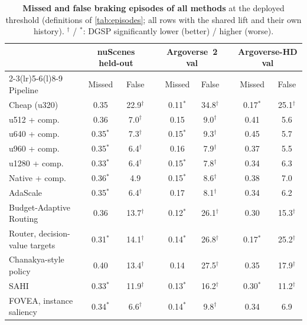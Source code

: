 \documentclass[10pt,letterpaper]{article}
\newcommand{\method}{DGSP\xspace}
\theoremstyle{remark}
\theoremstyle{plain}
\theoremstyle{definition}
\begin{document}
\begin{table}[!htbp]
\centering
\caption{\textbf{Missed and false braking episodes of all methods} at the deployed threshold (definitions of \cref{tab:episodes}; all rows with the shared lift and their own history). $^{\dagger}$ / $^{\ast}$: \method significantly lower (better) / higher (worse).}
\label{tab:episodes_all}
\footnotesize
\setlength{\tabcolsep}{4pt}
\begin{tabular}{@{}lcccccccc@{}}
\toprule
 & \multicolumn{2}{c}{nuScenes held-out} & & \multicolumn{2}{c}{Argoverse~2 val} & & \multicolumn{2}{c}{Argoverse-HD val} \\
\cmidrule(lr){2-3}\cmidrule(lr){5-6}\cmidrule(l){8-9}
Pipeline & Missed & False & & Missed & False & & Missed & False \\
\midrule
Cheap (u320) & 0.35 & 22.9$^{\dagger}$ &  & 0.11$^{\ast}$ & 34.8$^{\dagger}$ &  & 0.17$^{\ast}$ & 25.1$^{\dagger}$ \\
u512 + comp. & 0.36 & 7.0$^{\dagger}$ &  & 0.15 & 9.0$^{\dagger}$ &  & 0.41 & 5.6 \\
u640 + comp. & 0.35$^{\ast}$ & 7.3$^{\dagger}$ &  & 0.15$^{\ast}$ & 9.3$^{\dagger}$ &  & 0.45 & 5.7 \\
u960 + comp. & 0.35$^{\ast}$ & 6.4$^{\dagger}$ &  & 0.16 & 7.9$^{\dagger}$ &  & 0.37 & 5.5 \\
u1280 + comp. & 0.33$^{\ast}$ & 6.4$^{\dagger}$ &  & 0.15$^{\ast}$ & 7.8$^{\dagger}$ &  & 0.34 & 6.3 \\
Native + comp. & 0.36$^{\ast}$ & 4.9 &  & 0.15$^{\ast}$ & 8.6$^{\dagger}$ &  & 0.38 & 7.0 \\
\midrule
AdaScale & 0.35$^{\ast}$ & 6.4$^{\dagger}$ &  & 0.17 & 8.1$^{\dagger}$ &  & 0.34 & 6.2 \\
Budget-Adaptive Routing & 0.36 & 13.7$^{\dagger}$ &  & 0.12$^{\ast}$ & 26.1$^{\dagger}$ &  & 0.30 & 15.3$^{\dagger}$ \\
Router, decision-value targets & 0.31$^{\ast}$ & 14.1$^{\dagger}$ &  & 0.14$^{\ast}$ & 26.8$^{\dagger}$ &  & 0.17$^{\ast}$ & 25.2$^{\dagger}$ \\
Chanakya-style policy & 0.40 & 13.4$^{\dagger}$ &  & 0.14 & 27.5$^{\dagger}$ &  & 0.35 & 17.9$^{\dagger}$ \\
SAHI & 0.33$^{\ast}$ & 11.9$^{\dagger}$ &  & 0.13$^{\ast}$ & 16.2$^{\dagger}$ &  & 0.30$^{\ast}$ & 11.2$^{\dagger}$ \\
FOVEA, instance saliency & 0.34$^{\ast}$ & 6.6$^{\dagger}$ &  & 0.14$^{\ast}$ & 9.8$^{\dagger}$ &  & 0.34 & 6.9 \\

\end{tabular}
\end{table}
\end{document}
